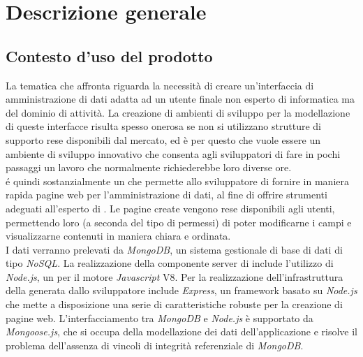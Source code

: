 \section{Descrizione generale}

	\subsection{Contesto d'uso del prodotto}
		
		La tematica che \ProjectName{} affronta riguarda la necessità di creare un'interfaccia di amministrazione di dati  adatta ad un utente finale non esperto di informatica ma del dominio di attività. La creazione di ambienti di sviluppo per la modellazione di queste interfacce risulta spesso onerosa se non si utilizzano strutture di supporto rese disponibili dal mercato, ed è per questo che \ProjectName{} vuole essere	un ambiente di sviluppo innovativo che consenta agli sviluppatori di fare in pochi passaggi un lavoro che normalmente richiederebbe loro diverse ore.\\
		\ProjectName{} é quindi sostanzialmente un  che permette allo sviluppatore di fornire in maniera rapida pagine web per l'amministrazione di dati, al fine di offrire strumenti adeguati all'esperto di . Le pagine create vengono rese disponibili agli utenti, permettendo loro (a seconda del tipo di permessi) di poter modificarne i campi e visualizzarne contenuti in maniera chiara e ordinata.\\
		I dati verranno prelevati da \textit{MongoDB}, un sistema 	gestionale di base di dati di tipo \textit{NoSQL}. La realizzazione della componente server di \ProjectName{} include l'utilizzo di \textit{Node.js}, un   per il motore \textit{Javascript} V8. Per la realizzazione dell'infrastruttura della  generata dallo sviluppatore \ProjectName{} include \textit{Express}, un framework basato su \textit{Node.js} che mette a disposizione una serie di caratteristiche robuste per la creazione di pagine web. L'interfacciamento tra \textit{MongoDB} e \textit{Node.js} è supportato da \textit{Mongoose.js}, che si occupa della modellazione dei dati dell'applicazione e risolve il problema dell'assenza di vincoli di integrità referenziale di \textit{MongoDB}.

